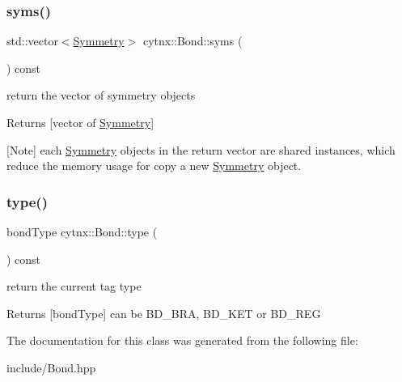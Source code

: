 \subsubsection{\texorpdfstring{syms()}{syms()}}
{\footnotesize\ttfamily std\+::vector$<$\hyperlink{classcytnx_1_1Symmetry}{Symmetry}$>$ cytnx\+::\+Bond\+::syms (\begin{DoxyParamCaption}{ }\end{DoxyParamCaption}) const\hspace{0.3cm}{\ttfamily [inline]}}



return the vector of symmetry objects 

\begin{DoxyReturn}{Returns}
\mbox{[}vector of \hyperlink{classcytnx_1_1Symmetry}{Symmetry}\mbox{]}
\end{DoxyReturn}
\mbox{[}Note\mbox{]} each \hyperlink{classcytnx_1_1Symmetry}{Symmetry} objects in the return vector are shared instances, which reduce the memory usage for copy a new \hyperlink{classcytnx_1_1Symmetry}{Symmetry} object. \mbox{\label{classcytnx_1_1Bond_a8517743cec9589ed551114ea7e55fbb1}} 
\subsubsection{\texorpdfstring{type()}{type()}}
{\footnotesize\ttfamily bond\+Type cytnx\+::\+Bond\+::type (\begin{DoxyParamCaption}{ }\end{DoxyParamCaption}) const\hspace{0.3cm}{\ttfamily [inline]}}



return the current tag type 

\begin{DoxyReturn}{Returns}
\mbox{[}bond\+Type\mbox{]} can be B\+D\+\_\+\+B\+RA, B\+D\+\_\+\+K\+ET or B\+D\+\_\+\+R\+EG 
\end{DoxyReturn}


The documentation for this class was generated from the following file\+:\begin{DoxyCompactItemize}
\item 
include/Bond.\+hpp\end{DoxyCompactItemize}
